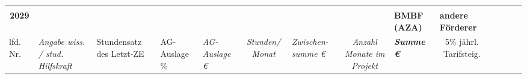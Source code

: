 \begin{table}[]
\begin{tabular}{cllllrrrcrrrrrr}
\rowcolor[HTML]{C6D9F1} 
\multicolumn{1}{l}{\cellcolor[HTML]{C6D9F1}\textbf{}}                                   &                                           &                                          &                                                     &                                                     & \multicolumn{1}{l}{\cellcolor[HTML]{C6D9F1}}                      & \multicolumn{1}{l}{\cellcolor[HTML]{C6D9F1}}               & \multicolumn{1}{l}{\cellcolor[HTML]{C6D9F1}}                 & \multicolumn{1}{l}{\cellcolor[HTML]{C6D9F1}}              & \multicolumn{1}{l}{\cellcolor[HTML]{C6D9F1}}                             & \multicolumn{1}{l}{\cellcolor[HTML]{C6D9F1}}                                  & \multicolumn{1}{l}{\cellcolor[HTML]{C6D9F1}}          & \multicolumn{1}{l}{\cellcolor[HTML]{C6D9F1}}          & \multicolumn{1}{l}{\cellcolor[HTML]{92D050}\textbf{}}             & \multicolumn{1}{l}{\cellcolor[HTML]{92D050}\textbf{}}          \\
\rowcolor[HTML]{B9CDE5} 
\textbf{2029}                                                                           &                                           &                                          &                                                     &                                                     & \multicolumn{1}{l}{\cellcolor[HTML]{B9CDE5}}                      & \multicolumn{1}{l}{\cellcolor[HTML]{B9CDE5}}               & \multicolumn{1}{l}{\cellcolor[HTML]{B9CDE5}}                 & \multicolumn{1}{l}{\cellcolor[HTML]{B9CDE5}}              & \multicolumn{1}{l}{\cellcolor[HTML]{C6D9F1}\textbf{BMBF (AZA)}}          & \multicolumn{1}{l}{\cellcolor[HTML]{C6D9F1}\textbf{andere Förderer}}          & \multicolumn{1}{l}{\cellcolor[HTML]{C6D9F1}}          & \multicolumn{1}{l}{\cellcolor[HTML]{C6D9F1}}          & \multicolumn{1}{l}{\cellcolor[HTML]{92D050}\textbf{}}             & \multicolumn{1}{l}{\cellcolor[HTML]{92D050}\textit{\textbf{}}} \\
\multicolumn{1}{l}{lfd. Nr.}                                                            & \multicolumn{2}{l}{\cellcolor[HTML]{FFFF99}\textit{Angabe wiss. / stud. Hilfskraft}} & \cellcolor[HTML]{FFFF99}Stundensatz des Letzt-ZE    & \cellcolor[HTML]{FFFF99}AG-Auslage \%               & \multicolumn{1}{l}{\cellcolor[HTML]{FFFF99}\textit{AG-Auslage €}} & \multicolumn{1}{c}{\textit{Stunden/ Monat}}                & \multicolumn{1}{l}{\textit{Zwischen-summe €}}                & \cellcolor[HTML]{FFFF99}\textit{Anzahl Monate im Projekt} & \multicolumn{1}{l}{\cellcolor[HTML]{92D050}\textit{\textbf{Summe €}}}    & \multicolumn{1}{c}{5\% jährl. Tarifsteig.}                                    & \multicolumn{1}{l}{\cellcolor[HTML]{92D050}\textit{}} & \multicolumn{1}{l}{\cellcolor[HTML]{FFFF99}\textit{}} & \multicolumn{1}{l}{\cellcolor[HTML]{BFBFBF}\textit{\textbf{}}}    & \multicolumn{1}{l}{\textit{\textbf{}}}                         \\

\end{tabular}
\end{table}
